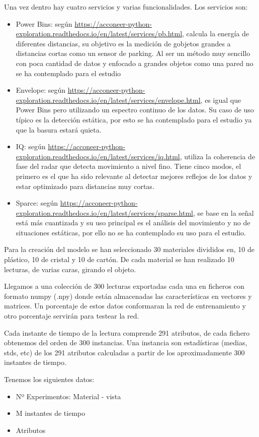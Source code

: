 Una vez dentro hay cuatro servicios y varias funcionalidades. Los servicios son:
\begin{itemize}
\item Power Bins: según \url{https://acconeer-python-exploration.readthedocs.io/en/latest/services/pb.html}, calcula la energía de diferentes distancias, su objetivo es la medición de gobjetos grandes a distancias cortas como un sensor de parking. Al ser un método muy sencillo con poca cantidad de datos y enfocado a grandes objetos como una pared no se ha contemplado para el estudio
\item Envelope: según \url{https://acconeer-python-exploration.readthedocs.io/en/latest/services/envelope.html}, es igual que Power Bins pero utilizando un espectro continuo de los datos. Su caso de uso típico es la detección estática, por esto se ha contemplado para el estudio ya que la basura estará quieta.
\item IQ: según \url{https://acconeer-python-exploration.readthedocs.io/en/latest/services/iq.html}, utiliza la coherencia de fase del radar que detecta movimiento a nivel fino. Tiene cinco modos, el primero es el que ha sido relevante al detectar mejores reflejos de los datos y estar optimizado para distancias muy cortas.
\item Sparce: según \url{https://acconeer-python-exploration.readthedocs.io/en/latest/services/sparse.html}, se base en la señal está más cuantizada y su uso principal es el análisis del movimiento y no de situaciones estáticas, por ello no se ha contemplado su uso para el estudio.
\end{itemize}


Para la creación del modelo se han seleccionado 30 materiales divididos en, 10 de plástico, 10 de cristal y 10 de cartón. De cada material se han realizado 10 lecturas, de varias caras, girando el objeto.

Llegamos a una colección de 300 lecturas exportadas cada una en ficheros con formato numpy (.npy) donde están almacenadas las características en vectores y matrices. Un porcentaje de estos datos conformaran la red de entrenamiento y otro porcentaje servirán para testear la red.

Cada instante de tiempo de la lectura comprende 291 atributos, de cada fichero obtenemos del orden de 300 instancias.
Una instancia son estadísticas (medias, stds, etc) de los 291 atributos calculadas a partir de los aproximadamente 300 instantes de tiempo.

Tenemos los siguientes datos:
\begin{itemize}
\item Nº Experimentos: Material - vista
\item M instantes de tiempo
\item Atributos
\end{itemize}
